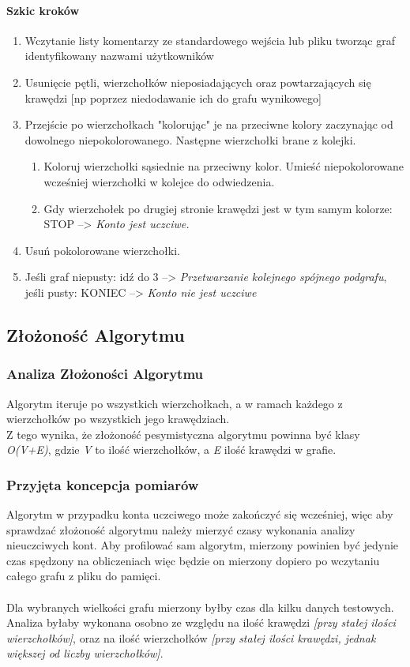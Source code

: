\documentclass[11pt]{article}
\newcommand{\+}{\discretionary{\mbox{\scriptsize$\hookleftarrow$}}{}{}}
\begin{document}
\paragraph{Szkic kroków}
\renewcommand{\labelenumi}{\arabic{enumi}}
\begin{enumerate}
\item
Wczytanie listy komentarzy ze standardowego wejścia lub pliku tworząc graf identyfikowany nazwami użytkowników
\item
Usunięcie pętli, wierzchołków nieposiadających oraz powtarzających się krawędzi [np poprzez niedodawanie ich do grafu wynikowego]
\item
Przejście po wierzchołkach "kolorując" je na przeciwne kolory zaczynając od dowolnego niepokolorowanego. Następne wierzchołki brane z kolejki.
\renewcommand{\labelenumii}{\Roman{enumii}}
\begin{enumerate}
\item
Koloruj wierzchołki sąsiednie na przeciwny kolor. Umieść niepokolorowane wcześniej wierzchołki w kolejce do odwiedzenia.
\item
Gdy wierzchołek po drugiej stronie krawędzi jest w tym samym kolorze: \\STOP --> \textsl{Konto jest uczciwe.}
\end{enumerate}
\item
Usuń pokolorowane wierzchołki.
\item
Jeśli graf niepusty: idź do 3 --> \textsl{Przetwarzanie kolejnego spójnego podgrafu},\\ jeśli pusty: KONIEC --> \textsl{Konto nie jest uczciwe}
\end{enumerate}
\subsection{Złożoność Algorytmu}
\subsubsection{Analiza Złożoności Algorytmu}
Algorytm iteruje po wszystkich wierzchołkach, a w ramach każdego z wierzchołków po wszystkich jego krawędziach.\\
Z tego wynika, że złożoność pesymistyczna algorytmu powinna być klasy \textit{O(V+E)}, gdzie \textit{V} to ilość wierzchołków, a \textit{E} ilość krawędzi w grafie.
\subsubsection{Przyjęta koncepcja pomiarów}
Algorytm w przypadku konta uczciwego może zakończyć się wcześniej, więc aby sprawdzać złożoność algorytmu należy mierzyć czasy wykonania analizy nieuczciwych kont. Aby profilować sam algorytm, mierzony powinien być jedynie czas spędzony na obliczeniach więc będzie on mierzony dopiero po wczytaniu całego grafu z pliku do pamięci. \\\\
Dla wybranych wielkości grafu mierzony byłby czas dla kilku danych testowych. Analiza byłaby wykonana osobno ze względu na ilość krawędzi \textsl{[przy stałej ilości wierzchołków]}, oraz na ilość wierzchołków \textsl{[przy stałej ilości krawędzi, jednak większej od liczby wierzchołków]}.
\end{document}
